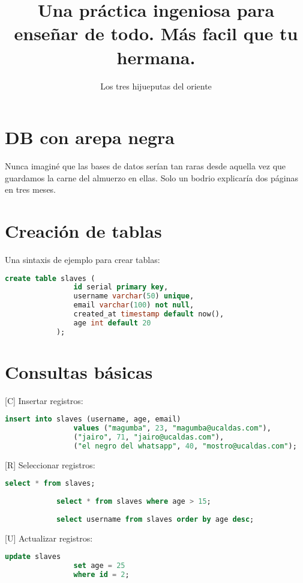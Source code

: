 \documentclass{article}
\title{Una práctica ingeniosa para enseñar de todo. Más facil que tu hermana.}
\author{Los tres hijueputas del oriente}
\begin{document}
	
	
	
	{\centering \section*{DB con arepa negra}}
	
	\setcounter{section}{0}
	
	Nunca imaginé que las bases de datos serían tan raras desde aquella vez que guardamos la carne del almuerzo en ellas. Solo un bodrio explicaría dos páginas en tres meses.
	
	\begin{multicols}{2}
		\section{Creación de tablas}
		
		Una sintaxis de ejemplo para crear tablas:
		\noindent
		\begin{lstlisting}[language=sql]
			create table slaves (
				id serial primary key,
				username varchar(50) unique,
				email varchar(100) not null,
				created_at timestamp default now(),
				age int default 20
			);
		\end{lstlisting}
		
		\section{Consultas básicas}
		
		[C] Insertar registros:
		\noindent
		\begin{lstlisting}[language=sql]
			insert into slaves (username, age, email)
				values ("magumba", 23, "magumba@ucaldas.com"),
				("jairo", 71, "jairo@ucaldas.com"),
				("el negro del whatsapp", 40, "mostro@ucaldas.com");
		\end{lstlisting}
		
		[R] Seleccionar registros:
		\noindent
		\begin{lstlisting}[language=sql]
			select * from slaves;
			
			select * from slaves where age > 15;
			
			select username from slaves order by age desc;
		\end{lstlisting}
		
		[U] Actualizar registros:
		\noindent
		\begin{lstlisting}[language=sql]
			update slaves
				set age = 25
				where id = 2;
		\end{lstlisting}
		

\end{multicols}
\end{document}
